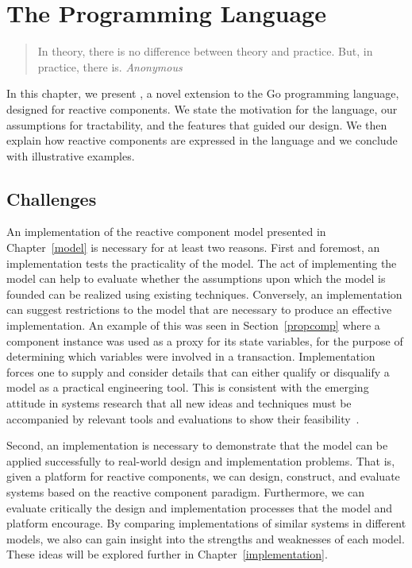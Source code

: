 \chapter{The \rcgo{} Programming Language}
\label{language}

\begin{quote}
In theory, there is no difference between theory and practice.
But, in practice, there is.  \emph{Anonymous}
\end{quote}

In this chapter, we present \rcgo{}, a novel extension to the Go programming language, designed for reactive components.
We state the motivation for the \rcgo{} language, our assumptions for tractability, and the features that guided our design.
We then explain how reactive components are expressed in the language and we conclude with illustrative examples.

\section{Challenges}
An implementation of the reactive component model presented in Chapter~\ref{model} is necessary for at least two reasons.
First and foremost, an implementation tests the practicality of the model.
The act of implementing the model can help to evaluate whether the assumptions upon which the model is founded can be realized using existing techniques.
Conversely, an implementation can suggest restrictions to the model that are necessary to produce an effective implementation.
An example of this was seen in Section~\ref{propcomp} where a component instance was used as a proxy for its state variables, for the purpose of determining which variables were involved in a transaction.
Implementation forces one to supply and consider details that can either qualify or disqualify a model as a practical engineering tool.
This is consistent with the emerging attitude in systems research that all new ideas and techniques must be accompanied by relevant tools and evaluations to show their feasibility~\cite{Krishnamurthi:2015:RSC:2739250.2658987}.

Second, an implementation is necessary to demonstrate that the model can be applied successfully to real-world design and implementation problems.
That is, given a platform for reactive components, we can design, construct, and evaluate systems based on the reactive component paradigm.
Furthermore, we can evaluate critically the design and implementation processes that the model and platform encourage.
By comparing implementations of similar systems in different models, we also can gain insight into the strengths and weaknesses of each model.
These ideas will be explored further in Chapter~\ref{implementation}.

